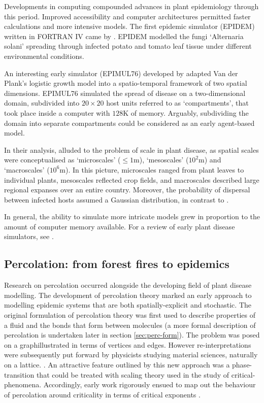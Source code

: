 Developments in computing compounded advances in plant epidemiology through this period. 
Improved accessibility and computer architectures permitted faster calculations and more intensive models. 
The first epidemic simulator (EPIDEM) written in FORTRAN IV came by \cite{waggoner1969epidem}. 
EPIDEM modelled the fungi `Alternaria solani' spreading through infected potato and tomato leaf tissue under different environmental conditions. 
    
An interesting early simulator (EPIMUL76) developed by \cite{zadoks1977role} adapted Van der Plank's logistic growth model into a spatio-temporal framework of two spatial dimensions. 
EPIMUL76 simulated the spread of disease on a two-dimensional domain, subdivided into $20\times 20$ host units referred to as `compartments', that took place inside a computer with $128\mathrm{K}$ of memory.
Arguably, subdividing the domain into separate compartments could be considered as an early agent-based model. 

In their analysis, \cite{zadoks1977role} alluded to the problem of scale in plant disease, as spatial scales
were conceptualised as `microscales' ($\leq 1\mathrm{m}$), `mesoscales' ($10^2\mathrm{m}$) and `macroscales' ($10^6\mathrm{m}$).
In this picture, microscales ranged from plant leaves to individual plants, mesoscales reflected crop fields, and macroscales
described large regional expanses over an entire country. Moreover, the probability of dispersal between infected hosts assumed a
Gaussian distribution, in contrast to \cite{doi:10.1146/annurev.py.06.090168.001201}.

In general, the ability to simulate more intricate models grew in proportion to the amount of computer memory available.
For a review of early plant disease simulators, see \cite{doi:10.1146/annurev.py.23.090185.002031}.

\subsection{Percolation: from forest fires to epidemics}
\label{section:lit-rev-perc}

Research on percolation occurred alongside the developing field of plant disease modelling.
The development of percolation theory marked an early approach to modelling epidemic systems that are
both spatially-explicit and stochastic.
The original formulation of percolation theory was first used to describe properties of a fluid and the 
bonds that form between molecules \cite{perco_origin} (a more formal description of 
percolation is undertaken later in section \ref{sec:perc-form}). The problem was posed on a 
graph\textemdash illustrated in terms of vertices and edges. However re-interpretations were subsequently 
put forward by physicists studying material sciences, naturally on a lattice. \cite{Essam_1980}. 
An attractive feature outlined by this new approach was a phase-transition that could be treated with scaling theory\textemdash
used in the study of critical-phenomena. 
Accordingly, early work rigorously ensued to map out the behaviour of percolation around criticality in 
terms of critical exponents \cite{STAUFFER19791}. 

